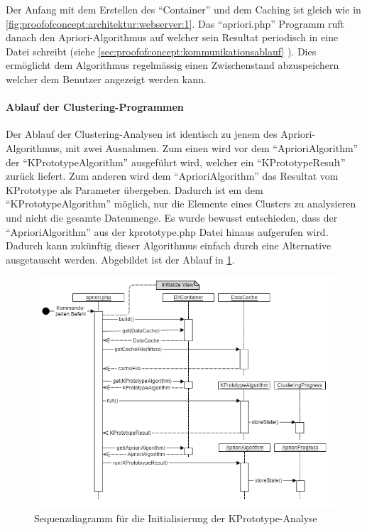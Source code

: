 Der Anfang mit dem Erstellen des "`Container"' und dem Caching ist gleich wie in \cref{fig:proofofconcept:architektur:webserver:1}. Das "`apriori.php"' Programm ruft danach den Apriori-Algorithmus auf welcher sein Resultat periodisch in eine Datei schreibt (siehe \cref{sec:proofofconcept:kommunikationsablauf} ). Dies ermöglicht dem Algorithmus regelmässig einen Zwischenstand abzuspeichern welcher dem Benutzer angezeigt werden kann.

\paragraph{Ablauf der Clustering-Programmen}
Der Ablauf der Clustering-Analysen ist identisch zu jenem des Apriori-Algorithmus, mit zwei Ausnahmen. Zum einen wird vor dem "`AprioriAlgorithm"' der "`KPrototypeAlgorithm"' ausgeführt wird, welcher ein "`KPrototypeResult"' zurück liefert. 
Zum anderen wird dem "`AprioriAlgorithm"' das Resultat vom KPrototype als Parameter übergeben. Dadurch ist em dem "`KPrototypeAlgorithm"' möglich, nur die Elemente eines Clusters zu analysieren und nicht die gesamte Datenmenge. 
Es wurde bewusst entschieden, dass der "`AprioriAlgorithm"' aus der kprototype.php Datei hinaus aufgerufen wird. Dadurch kann zukünftig dieser Algorithmus einfach durch eine Alternative ausgetauscht werden.
Abgebildet ist der Ablauf in \cref{fig:proofofconcept:architektur:hintergrundprozesser:2}. 
\begin{figure}[H]
	\centering
	\includegraphics[width=1\textwidth]{images/diagram-sequence-kprototype}
	\caption{Sequenzdiagramm für die Initialisierung der KPrototype-Analyse}
	\label{fig:proofofconcept:architektur:hintergrundprozesser:2}
\end{figure}

